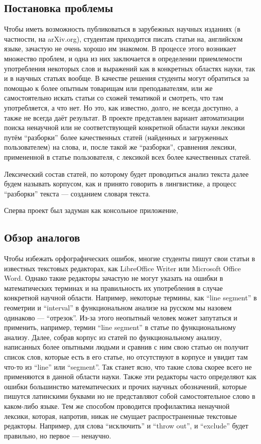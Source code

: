 \documentclass[a4paper,openbib]{report}
\begin{document}

\subsection*{Постановка проблемы}

Чтобы иметь возможность публиковаться в зарубежных научных изданиях (в частности, на arXiv.org), студентам приходится писать статьи на, английском языке, 
зачастую не очень хорошо им знакомом. В процессе этого возникает множество проблем, и одна из них заключается в определении приемлемости 
употребления некоторых слов и выражений как в конкретных областях науки, так и в научных статьях вообще. В качестве решения студенты могут обратиться 
за помощью к более опытным товарищам или преподавателям, или же самостоятельно искать статьи со схожей тематикой и смотреть, что там употребляется, а 
что нет. Но это, как известно, долго, не всегда доступно, а также не всегда даёт результат.
В проекте представлен вариант автоматизации поиска ненаучной или не соответствующей конкретной области науки лексики путём ``разборки'' более 
качественных статей (найденных и загруженных пользователем) на слова, и, после такой же ``разборки'', сравнения лексики, примененной в статье 
пользователя, с лексикой всех более качественных статей.

Лексический состав статей, по которому будет проводиться анализ текста далее будем называть корпусом, как и принято говорить в лингвистике, а процесс 
``разборки'' текста --- созданием словаря текста.

Сперва проект был задуман как консольное приложение, 

\subsection*{Обзор аналогов}

Чтобы избежать орфографических ошибок, многие студенты пишут свои статьи в известных текстовых редакторах, как LibreOffice Writer или Microsoft Office Word.
Однако такие редакторы зачастую не могут указать на ошибки в математических терминах и на правильность их употребления в случае конкретной научной области. 
Например, некоторые термины, как ``line segment'' в геометрии и ``interval'' в функциональном анализе на русском мы назовем одинаково --- ``отрезок''. 
Из-за этого неопытный человек может запутаться и применить, например, термин ``line segment'' в статье по функциональному анализу. Далее, собрав корпус 
из статей по функциональному анализу, написанных более опытными людьми и сравнив с ним свою статью он получит список слов, которые есть в его статье, но 
отсутствуют в корпусе и увидит там что-то из ``line'' или ``segment''. Так станет ясно, что такие слова скорее всего не применяются 
в данной области науки.
Также эти редакторы часто определяют как ошибки большинство математических и прочих научных обозначений, которые пишутся латинскими буквами но не представляют 
собой самостоятельное слово в каком-либо языке. 
Тем же способом проводится профилактика ненаучной лексики, которая, напротив, никак не смущает распространенные текстовые редакторы. Например, для слова 
``исключить'' и ``throw out'', и ``exclude'' будет правильно, но первое --- ненаучно.
\end{document}
